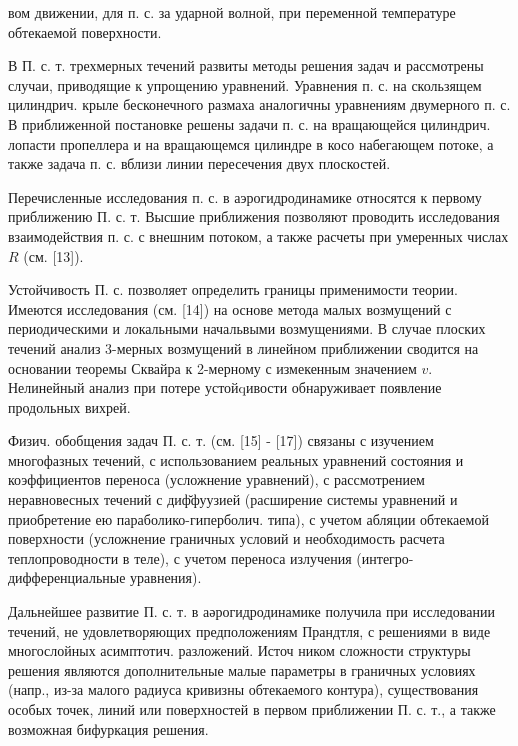 \documentclass[10pt]{article}
\begin{document}
вом движении, для п. с. за ударной волной, при переменной температуре обтекаемой поверхности.



В П. с. т. трехмерных течений развиты методы решения задач и рассмотрены случаи, приводящие к упрощению уравнений. Уравнения п. с. на скользящем цилиндрич. крыле бесконечного размаха аналогичны уравнениям двумерного п. с. В приближенной постановке решены задачи п. с. на вращающейся цилиндрич. лопасти пропеллера и на вращающемся цилиндре в косо набегающем потоке, а также задача п. с. вблизи линии пересечения двух плоскостей.



Перечисленные исследования п. с. в аэрогидродинамике относятся к первому приближению П. с. т. Высшие приближения позволяют проводить исследования взаимодействия п. с. с внешним потоком, а также расчеты при умеренных числах $R$ (см. [13]).



Устойчивость П. с. позволяет определить границы применимости теории. Имеются исследования (см. [14]) на основе метода малых возмущений с периодическими и локальными начальвыми возмущениями. В случае плоских течений анализ 3-мерных возмущений в линейном приближении сводится на основании теоремы Сквайра к 2-мерному с измекенным значением $v$. Нелинейный анализ при потере устойqивости обнаруживает появление продольных вихрей.



Физич. обобщения задач П. с. т. (см. [15] - [17]) связаны с изучением многофазных течений, с использованием реальных уравнений состояния и коэффициентов переноса (усложнение уравнений), с рассмотрением неравновесных течений с диф̆фуузией (расширение системы уравнений и приобретение ею параболико-гиперболич. типа), с учетом абляции обтекаемой поверхности (усложнение граничных условий и необходимость расчета теплопроводности в теле), с учетом переноса излучения (интегро-дифференциальные уравнения).



Дальнейшее развитие П. с. т. в аәрогидродинамике получила при исследовании течений, не удовлетворяющих предположениям Прандтля, с решениями в виде многослойных асимптотич. разложений. Источ ником сложности структуры решения являются дополнительные малые параметры в граничных условиях (напр., из-за малого радиуса кривизны обтекаемого контура), существования особых точек, линий или поверхностей в первом приближении П. с. т., а также возможная бифуркация решения.
\end{document}
